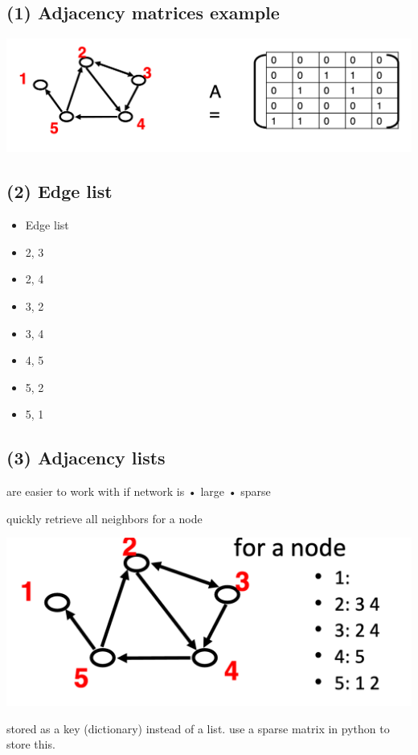 \documentclass[11pt]{article}
\theoremstyle{definition}
\begin{document}
\subsection{(1) Adjacency matrices example}
\includegraphics[width=\textwidth/2]{10.png}

\subsection{(2) Edge list}
\begin{itemize}
    \item Edge list
    \item 2, 3
    \item 2, 4
    \item 3, 2
    \item 3, 4
    \item 4, 5
    \item 5, 2
    \item 5, 1
\end{itemize}

\subsection{(3) Adjacency lists}
are easier to work with if
network is
• large
• sparse

quickly retrieve all neighbors
for a node

\includegraphics[width=\textwidth/2]{11.png}

stored as a key (dictionary) instead of a list. 
use a sparse matrix in python to store this.
\end{document}
